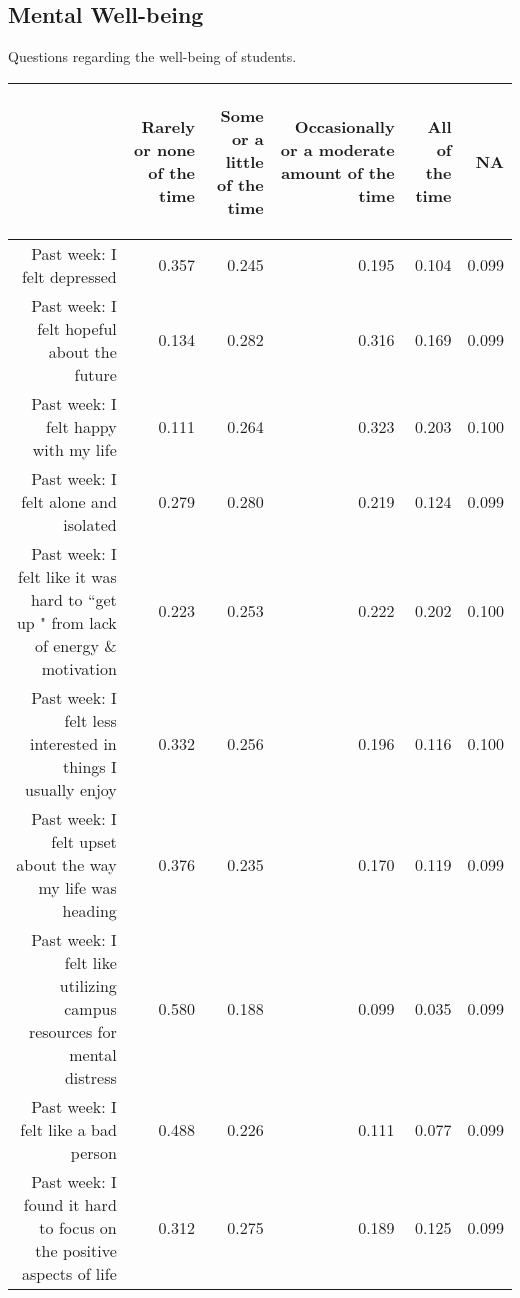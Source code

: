 \documentclass{article}\usepackage[]{graphicx}\usepackage[]{color}
\makeatletter
\newenvironment{kframe}{%
 \def\at@end@of@kframe{}%
 \ifinner\ifhmode%
  \def\at@end@of@kframe{\end{minipage}}%
  \begin{minipage}{\columnwidth}%
 \fi\fi%
 \def\FrameCommand##1{\hskip\@totalleftmargin \hskip-\fboxsep
 \colorbox{shadecolor}{##1}\hskip-\fboxsep
     \hskip-\linewidth \hskip-\@totalleftmargin \hskip\columnwidth}%
 \MakeFramed {\advance\hsize-\width
   \@totalleftmargin\z@ \linewidth\hsize
   \@setminipage}}%
 {\par\unskip\endMakeFramed%
 \at@end@of@kframe}
\makeatother
\begin{document}
\newpage

\subsection{Mental Well-being}
Questions regarding the well-being of students.
\begin{table}[ht]
\centering
\begin{tabular}{rrrrrr}
  \hline
 & \begin{sideways} Rarely or none of the time \end{sideways} & \begin{sideways} Some or a little of the time \end{sideways} & \begin{sideways} Occasionally or a moderate amount of the time \end{sideways} & \begin{sideways} All of the time \end{sideways} & \begin{sideways} NA \end{sideways} \\ 
  \hline
Past week: I felt depressed & 0.357 & 0.245 & 0.195 & 0.104 & 0.099 \\ 
  Past week: I felt hopeful about the future & 0.134 & 0.282 & 0.316 & 0.169 & 0.099 \\ 
  Past week: I felt happy with my life & 0.111 & 0.264 & 0.323 & 0.203 & 0.100 \\ 
  Past week: I felt alone and isolated & 0.279 & 0.280 & 0.219 & 0.124 & 0.099 \\ 
  Past week: I felt like it was hard to ``get up " from lack of energy \& motivation & 0.223 & 0.253 & 0.222 & 0.202 & 0.100 \\ 
  	Past week: I felt less interested in things I usually enjoy & 0.332 & 0.256 & 0.196 & 0.116 & 0.100 \\ 
  	Past week: I felt upset about the way my life was heading & 0.376 & 0.235 & 0.170 & 0.119 & 0.099 \\ 
  Past week: I felt like utilizing campus resources for mental distress & 0.580 & 0.188 & 0.099 & 0.035 & 0.099 \\ 
  Past week: I felt like a bad person & 0.488 & 0.226 & 0.111 & 0.077 & 0.099 \\ 
  Past week: I found it hard to focus on the positive aspects of life & 0.312 & 0.275 & 0.189 & 0.125 & 0.099 \\ 
   \hline
\end{tabular}
\end{table}
\begin{kframe}

{\ttfamily\noindent\bfseries{}}\end{kframe}
\end{document}
